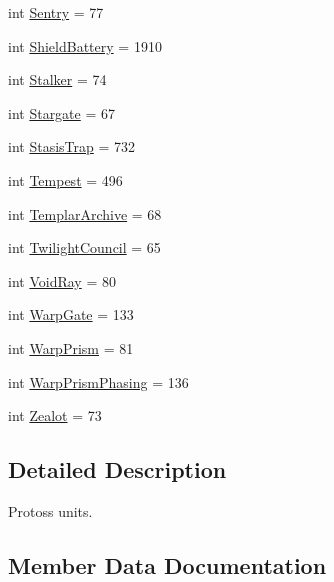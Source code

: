 \begin{DoxyCompactItemize}
int \mbox{\hyperlink{classpysc2_1_1lib_1_1units_1_1_protoss_a749cf405aab5328d86461897ec37fdda}{Sentry}} = 77
\item 
int \mbox{\hyperlink{classpysc2_1_1lib_1_1units_1_1_protoss_aab5f3cd1dfb95bd079d285da398620f9}{Shield\+Battery}} = 1910
\item 
int \mbox{\hyperlink{classpysc2_1_1lib_1_1units_1_1_protoss_ab3be13459e7744a0737f32d9dfa84c42}{Stalker}} = 74
\item 
int \mbox{\hyperlink{classpysc2_1_1lib_1_1units_1_1_protoss_a6da05426116644a427761d29655147ce}{Stargate}} = 67
\item 
int \mbox{\hyperlink{classpysc2_1_1lib_1_1units_1_1_protoss_aa0e38449de9806c51c4f098d2cfab316}{Stasis\+Trap}} = 732
\item 
int \mbox{\hyperlink{classpysc2_1_1lib_1_1units_1_1_protoss_a7a969f3f0f667f0332b1c6e38d240f57}{Tempest}} = 496
\item 
int \mbox{\hyperlink{classpysc2_1_1lib_1_1units_1_1_protoss_ab4101fb6a723abba8302075f3a539a09}{Templar\+Archive}} = 68
\item 
int \mbox{\hyperlink{classpysc2_1_1lib_1_1units_1_1_protoss_aea9522352ae5a983014eee41427b8058}{Twilight\+Council}} = 65
\item 
int \mbox{\hyperlink{classpysc2_1_1lib_1_1units_1_1_protoss_ad1eb98ef3c9f5455a0eee5a90df6efa0}{Void\+Ray}} = 80
\item 
int \mbox{\hyperlink{classpysc2_1_1lib_1_1units_1_1_protoss_a575c328f01872b7abf8c4eae1595fea3}{Warp\+Gate}} = 133
\item 
int \mbox{\hyperlink{classpysc2_1_1lib_1_1units_1_1_protoss_a3a84083e21b81f7fac416388fe016aba}{Warp\+Prism}} = 81
\item 
int \mbox{\hyperlink{classpysc2_1_1lib_1_1units_1_1_protoss_a448c111c501f04b0daab55eb593fb250}{Warp\+Prism\+Phasing}} = 136
\item 
int \mbox{\hyperlink{classpysc2_1_1lib_1_1units_1_1_protoss_a4c808c05c5d50f5057a6243f483c724e}{Zealot}} = 73
\end{DoxyCompactItemize}


\subsection{Detailed Description}
\begin{DoxyVerb}Protoss units.\end{DoxyVerb}
 

\subsection{Member Data Documentation}
\mbox{\label{classpysc2_1_1lib_1_1units_1_1_protoss_aab1e235a0b3761beea540d595cae2034}} 

